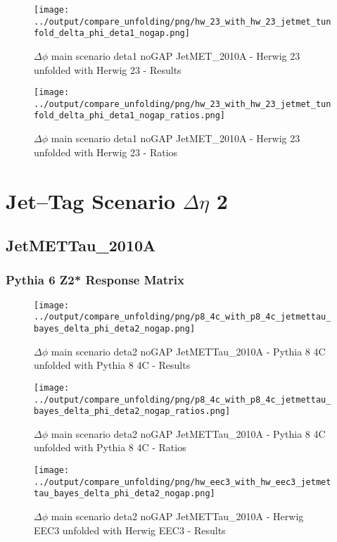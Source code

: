 \documentclass[11pt]{book}
\begin{document}
\begin{figure}[ht]
\centering
\texttt{[image: ../output/compare\_unfolding/png/hw\_23\_with\_hw\_23\_jetmet\_tunfold\_delta\_phi\_deta1\_nogap.png]}
\caption{$\Delta\phi$ main scenario deta1 noGAP JetMET\_2010A - Herwig 23 unfolded with Herwig 23 - Results}
\label{hw_23_hw_23_jetmet_tunfold_delta_phi_deta1_nogap_a}
\end{figure}

\begin{figure}[ht]
\centering
\texttt{[image: ../output/compare\_unfolding/png/hw\_23\_with\_hw\_23\_jetmet\_tunfold\_delta\_phi\_deta1\_nogap\_ratios.png]}
\caption{$\Delta\phi$ main scenario deta1 noGAP JetMET\_2010A - Herwig 23 unfolded with Herwig 23 - Ratios}
\label{hw_23_hw_23_jetmet_tunfold_delta_phi_deta1_nogap_b}
\end{figure}




\newpage
\chapter{Jet--Tag Scenario $\Delta\eta$ 2}
\section{JetMETTau\_2010A}
\subsection{Pythia 6 Z2* Response Matrix}



\begin{figure}[ht]
\centering
\texttt{[image: ../output/compare\_unfolding/png/p8\_4c\_with\_p8\_4c\_jetmettau\_bayes\_delta\_phi\_deta2\_nogap.png]}
\caption{$\Delta\phi$ main scenario deta2 noGAP JetMETTau\_2010A - Pythia 8 4C unfolded with Pythia 8 4C - Results}
\label{p8_p8_jetmettau_bayes_delta_phi_deta2_nogap_a}
\end{figure}

\begin{figure}[ht]
\centering
\texttt{[image: ../output/compare\_unfolding/png/p8\_4c\_with\_p8\_4c\_jetmettau\_bayes\_delta\_phi\_deta2\_nogap\_ratios.png]}
\caption{$\Delta\phi$ main scenario deta2 noGAP JetMETTau\_2010A - Pythia 8 4C unfolded with Pythia 8 4C - Ratios}
\label{p8_p8_jetmettau_bayes_delta_phi_deta2_nogap_b}
\end{figure}

\begin{figure}[ht]
\centering
\texttt{[image: ../output/compare\_unfolding/png/hw\_eec3\_with\_hw\_eec3\_jetmettau\_bayes\_delta\_phi\_deta2\_nogap.png]}
\caption{$\Delta\phi$ main scenario deta2 noGAP JetMETTau\_2010A - Herwig EEC3 unfolded with Herwig EEC3 - Results}
\label{hw_eec3_hw_eec3_jetmettau_bayes_delta_phi_deta2_nogap_a}
\end{figure}
\end{document}
